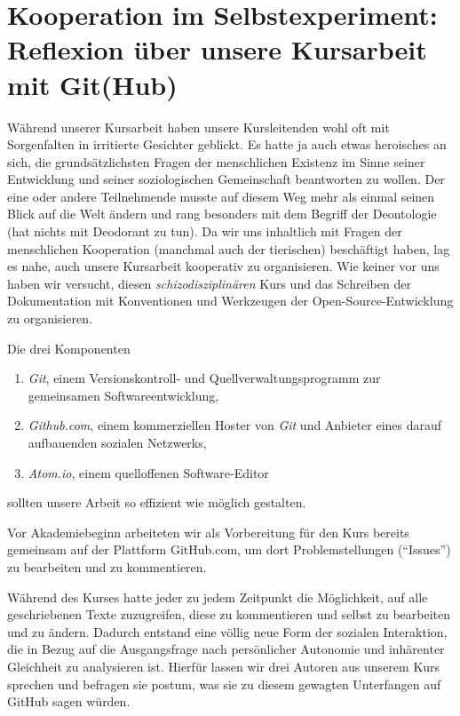 \section[Kursreflexion]{Kooperation im Selbstexperiment: Reflexion über unsere Kursarbeit mit Git(Hub)}

Während unserer Kursarbeit haben unsere Kursleitenden wohl oft mit Sorgenfalten in irritierte Gesichter geblickt.
Es hatte ja auch etwas heroisches an sich, die grundsätzlichsten Fragen der menschlichen Existenz im Sinne seiner Entwicklung und seiner soziologischen Gemeinschaft beantworten zu wollen.
Der eine oder andere Teilnehmende musste auf diesem Weg mehr als einmal seinen Blick auf die Welt ändern und rang besonders mit dem Begriff der Deontologie (hat nichts mit Deodorant zu tun).
Da wir uns inhaltlich mit Fragen der menschlichen Kooperation (manchmal auch der tierischen) beschäftigt haben, lag es nahe, auch unsere Kursarbeit kooperativ zu organisieren.
Wie keiner vor uns haben wir versucht, diesen \emph{schizodisziplinären} Kurs und das Schreiben der Dokumentation mit Konventionen und Werkzeugen der Open-Source-Entwicklung zu organisieren.

Die drei Komponenten

\begin{enumerate}
	\item \emph{Git}, einem Versionskontroll- und Quellverwaltungsprogramm zur gemeinsamen Softwareentwicklung,
	\item \emph{Github.com}, einem kommerziellen Hoster von \emph{Git} und Anbieter eines darauf aufbauenden sozialen Netzwerks,
	\item \emph{Atom.io}, einem quelloffenen Software-Editor
\end{enumerate}

sollten unsere Arbeit so effizient wie möglich gestalten.

Vor Akademiebeginn arbeiteten wir als Vorbereitung für den Kurs bereits gemeinsam auf der Plattform GitHub.com, um dort Problemstellungen (``Issues'') zu bearbeiten und zu kommentieren.

Während des Kurses hatte jeder zu jedem Zeitpunkt die Möglichkeit, auf alle geschriebenen Texte zuzugreifen, diese zu kommentieren und selbst zu bearbeiten und zu ändern.
Dadurch entstand eine völlig neue Form der sozialen Interaktion, die in Bezug auf die Ausgangsfrage nach persönlicher Autonomie und inhärenter Gleichheit zu analysieren ist.
Hierfür lassen wir drei Autoren aus unserem Kurs sprechen und befragen sie postum, was sie zu diesem gewagten Unterfangen auf GitHub sagen würden.


